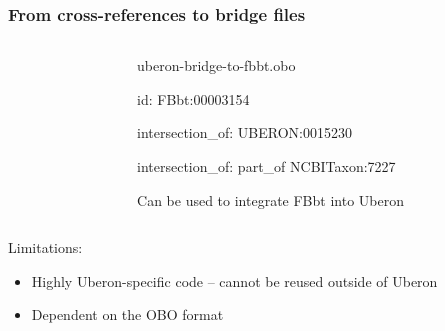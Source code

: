 \begin{frame}
  \frametitle{From cross-references to bridge files}

  \begin{columns}
    \begin{column}{.3\textwidth}
    \end{column}
    \begin{column}{.68\textwidth}
      \begin{block}{uberon-bridge-to-fbbt.obo}\ttfamily
[Term]

id: FBbt:00003154

intersection\_of: UBERON:0015230

intersection\_of: part\_of NCBITaxon:7227
      \end{block}

      Can be used to integrate FBbt into Uberon
    \end{column}
  \end{columns}

  \medskip
  Limitations:
  \begin{itemize}
    \item Highly Uberon-specific code -- cannot be reused outside of Uberon
    \item Dependent on the OBO format
  \end{itemize}
\end{frame}

